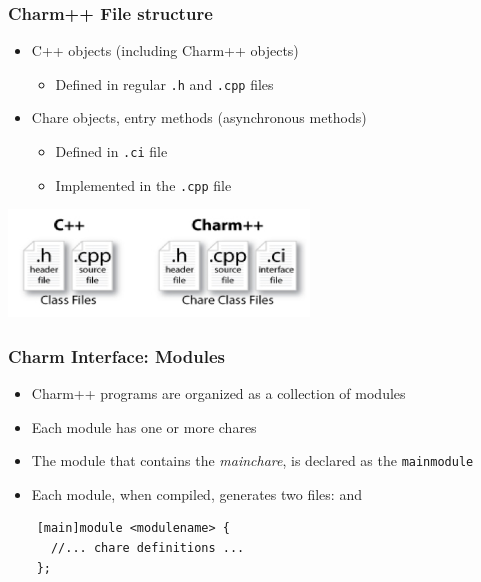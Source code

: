\begin{frame}
  \frametitle{Charm++ File structure}
  \begin{itemize}
    \item C++ objects (including Charm++ objects)
      \begin{itemize}
      \item Defined in regular \texttt{.h} and \texttt{.cpp} files
      \end{itemize}
    \item Chare objects, entry methods (asynchronous methods)
      \begin{itemize}
      \item Defined in \texttt{.ci} file
      \item Implemented in the \texttt{.cpp} file
      \end{itemize}
  \end{itemize}
  \begin{center}
    \includegraphics[width=0.6\textwidth]{figures/charmFiles.png}
  \end{center}
\end{frame}

\begin{frame}[fragile]
  \frametitle{Charm Interface: Modules}
  \begin{itemize}
    \item Charm++ programs are organized as a collection of modules
    \item Each module has one or more chares
    \item The module that contains the \textit{mainchare}, is declared as the
      \texttt{mainmodule}
    \item Each module, when compiled, generates two files:
       and 
  \end{itemize}
  \begin{center}
  \begin{lstlisting}
    [main]module <modulename> {
      //... chare definitions ...
    };
  \end{lstlisting}
  \end{center}
\end{frame}

